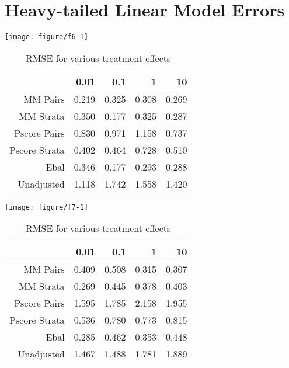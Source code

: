 \documentclass[11pt]{article}\usepackage[]{graphicx}\usepackage[]{color}
\makeatletter
\def\maxwidth{ %
  \ifdim\Gin@nat@width>\linewidth
    \linewidth
  \else
    \Gin@nat@width
  \fi
}
\newenvironment{knitrout}{}{} %
\makeatother
\begin{document}
\section{Heavy-tailed Linear Model Errors}
\begin{knitrout}
\color{fgcolor}

{\centering \texttt{[image: figure/f6-1]} 

}



\end{knitrout}
\begin{table}[ht]
\centering
\begin{tabular}{rrrrr}
  \hline
 & 0.01 & 0.1 & 1 & 10 \\ 
  \hline
MM Pairs & 0.219 & 0.325 & 0.308 & 0.269 \\ 
  MM Strata & 0.350 & 0.177 & 0.325 & 0.287 \\ 
  Pscore Pairs & 0.830 & 0.971 & 1.158 & 0.737 \\ 
  Pscore Strata & 0.402 & 0.464 & 0.728 & 0.510 \\ 
  Ebal & 0.346 & 0.177 & 0.293 & 0.288 \\ 
  Unadjusted & 1.118 & 1.742 & 1.558 & 1.420 \\ 
   \hline
\end{tabular}
\caption{RMSE for various treatment effects} 
\label{tab:f6}
\end{table}


\begin{knitrout}
\color{fgcolor}

{\centering \texttt{[image: figure/f7-1]} 

}



\end{knitrout}
\begin{table}[ht]
\centering
\begin{tabular}{rrrrr}
  \hline
 & 0.01 & 0.1 & 1 & 10 \\ 
  \hline
MM Pairs & 0.409 & 0.508 & 0.315 & 0.307 \\ 
  MM Strata & 0.269 & 0.445 & 0.378 & 0.403 \\ 
  Pscore Pairs & 1.595 & 1.785 & 2.158 & 1.955 \\ 
  Pscore Strata & 0.536 & 0.780 & 0.773 & 0.815 \\ 
  Ebal & 0.285 & 0.462 & 0.353 & 0.448 \\ 
  Unadjusted & 1.467 & 1.488 & 1.781 & 1.889 \\ 
   \hline
\end{tabular}
\caption{RMSE for various treatment effects} 
\label{tab:f7}
\end{table}
\end{document}
